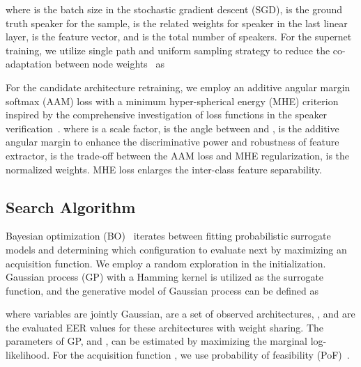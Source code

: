 \documentclass{article}
\begin{document}
where  is the batch size in the stochastic gradient descent (SGD),  is the ground truth speaker for the sample,  is the related weights for speaker  in the last linear layer,  is the feature vector, and  is the total number of speakers. For the supernet training, we utilize single path  and uniform sampling  strategy to reduce the co-adaptation between node weights~\cite{guo2020single} as


For the candidate architecture retraining, we employ an additive angular margin softmax (AAM) loss with a minimum hyper-spherical energy (MHE) criterion inspired by the comprehensive investigation of loss functions in the speaker verification~\cite{liu2019large}.  
where  is a scale factor,  is the angle between  and ,  is the additive angular margin to enhance the discriminative power and robustness of feature extractor,  is the trade-off between the AAM loss and MHE regularization,  is the  normalized weights. MHE loss enlarges the inter-class feature separability.
\subsection{Search Algorithm}\label{sec:search_algorithm}
Bayesian optimization (BO)~\cite{shahriari2015taking} iterates between fitting probabilistic surrogate models and determining which configuration to evaluate next by maximizing an acquisition function. We employ a random exploration in the initialization. Gaussian process (GP) with a Hamming kernel  is utilized as the surrogate function, and the generative model of Gaussian process can be defined as

where variables  are jointly Gaussian,  are a set of observed architectures, , and  are the evaluated EER values for these architectures with weight sharing. The parameters of GP,  and , can be estimated by maximizing the marginal log-likelihood. For the acquisition function , we use probability of feasibility (PoF)~\cite{gardner2014bayesian}. 
\end{document}
